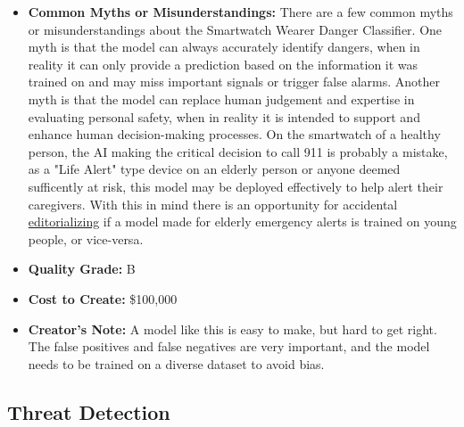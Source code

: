 \begin{itemize}
\begin{itemize}
    \item \textbf{Common Myths or Misunderstandings:} There are a few common myths or misunderstandings about the Smartwatch Wearer Danger Classifier. One myth is that the model can always accurately identify dangers, when in reality it can only provide a prediction based on the information it was trained on and may miss important signals or trigger false alarms. Another myth is that the model can replace human judgement and expertise in evaluating personal safety, when in reality it is intended to support and enhance human decision-making processes. On the smartwatch of a healthy person, the AI making the critical decision to call 911 is probably a mistake, as a "Life Alert" type device on an elderly person or anyone deemed sufficently at risk, this model may be deployed effectively to help alert their caregivers. With this in mind there is an opportunity for accidental \hyperref[sec:janitor]{editorializing} if a model made for elderly emergency alerts is trained on young people, or vice-versa.
    \item \textbf{Quality Grade:} B
    \item \textbf{Cost to Create:} \$100,000
    \item \textbf{Creator's Note:} A model like this is easy to make, but hard to get right. The false positives and false negatives are very important, and the model needs to be trained on a diverse dataset to avoid bias. 
\end{itemize}

\subsection{Threat Detection}


\end{itemize}
